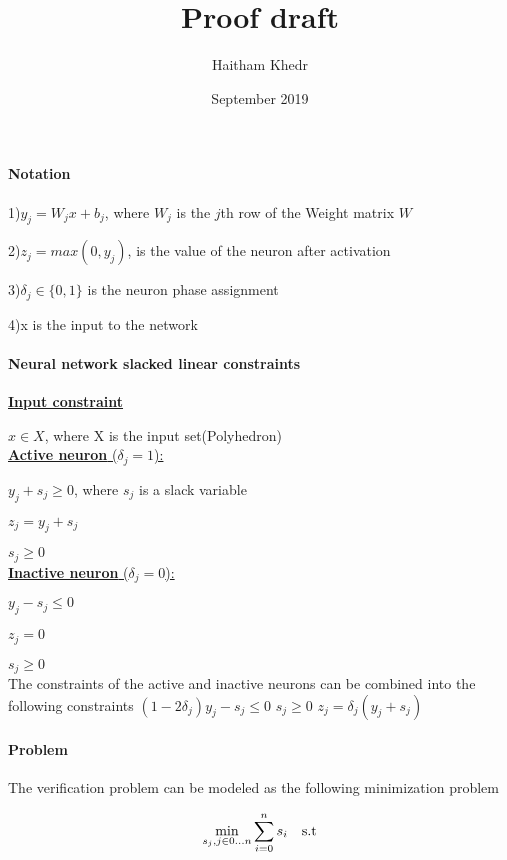 \documentclass{article}
\title{Proof draft}
\author{Haitham Khedr }
\date{September 2019}
\begin{document}
\maketitle

\paragraph{Notation}\noindent

1)$y_j =W_jx + b_j$, where $W_j$ is the $j$th row of the Weight matrix $W$

2)$z_j = max(0,y_j)$, is the value of the neuron after activation

3)$\delta_j\in{\{0,1\}}$ is the neuron phase assignment

4)x is the input to the network

\paragraph{Neural network slacked linear constraints\\} \noindent

\underline{\textbf{Input constraint}}

$x\in X$, where X is the input set(Polyhedron)\\

\underline{\textbf{Active neuron} (\emph{$\delta_j = 1$}):}

$y_j + s_j \geq 0$, where $ s_j$ is a slack variable

$z_j = y_j + s_j $

$s_j \geq 0$\\

\underline{\textbf{Inactive neuron} (\emph{$\delta_j = 0$}):}

$y_j - s_j \leq 0$

$z_j =0$

$s_j \geq 0$\\

The constraints of the active and inactive neurons can be combined into the following constraints
$(1-2\delta_j)y_j - s_j \leq 0$
$s_j \geq 0$
$z_j = \delta_j(y_j +s_j)$
\newpage
\paragraph{Problem\\} 

The verification problem can be modeled as the following minimization problem

$$\min\limits_{s_j,j\in{0\dots n}}\displaystyle\sum_{i=0}^{n}s_i\text{\quad s.t}$$
\end{document}
